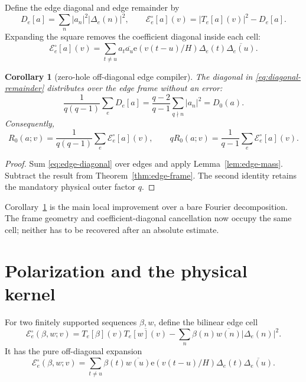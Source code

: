 \documentclass[11pt]{article}
\newtheorem{corollary}[theorem]{Corollary}
\newcommand{\e}{\mathrm e}
\newcommand{\cE}{\mathcal E}
\begin{document}
Define the edge diagonal and edge remainder by
\begin{equation}\label{eq:edge-diagonal}
 D_e[a]=\sum_n|a_n|^2|\Delta_e(n)|^2,
 \qquad
 \cE_e^\circ[a](v)=|T_e[a](v)|^2-D_e[a].
\end{equation}
Expanding the square removes the coefficient diagonal inside each cell:
\begin{equation}\label{eq:pure-off-diagonal}
 \boxed{
 \cE_e^\circ[a](v)=
 \sum_{t\ne u}a_t\overline{a_u}\e(v(t-u)/H)
 \Delta_e(t)\overline{\Delta_e(u)}.}
\end{equation}

\begin{corollary}[zero-hole off-diagonal edge compiler]
\label{cor:edge-compiler}
The diagonal in \eqref{eq:diagonal-remainder} distributes over the edge frame
without an error:
\begin{equation}\label{eq:diagonal-distribution}
 \frac1{q(q-1)}\sum_eD_e[a]
 =\frac{q-2}{q-1}\sum_{q\nmid n}|a_n|^2=D_0(a).
\end{equation}
Consequently,
\begin{equation}\label{eq:edge-remainder}
 \boxed{
 R_0(a;v)=\frac1{q(q-1)}\sum_e\cE_e^\circ[a](v),
 \qquad
 qR_0(a;v)=\frac1{q-1}\sum_e\cE_e^\circ[a](v).}
\end{equation}
\end{corollary}

\begin{proof}
Sum \eqref{eq:edge-diagonal} over edges and apply
Lemma~\ref{lem:edge-mass}.  Subtract the result from
Theorem~\ref{thm:edge-frame}.  The second identity retains the mandatory
physical outer factor $q$.
\end{proof}

Corollary~\ref{cor:edge-compiler} is the main local improvement over a bare
Fourier decomposition.  The frame geometry and coefficient-diagonal
cancellation now occupy the same cell; neither has to be recovered after an
absolute estimate.

\section{Polarization and the physical kernel}

For two finitely supported sequences $\beta,w$, define the bilinear edge cell
\begin{equation}\label{eq:bilinear-edge-cell}
 \cE_e^\circ(\beta,w;v)
 =T_e[\beta](v)\overline{T_e[w](v)}
 -\sum_n\beta(n)\overline{w(n)}|\Delta_e(n)|^2.
\end{equation}
It has the pure off-diagonal expansion
\begin{equation}\label{eq:bilinear-off-diagonal}
 \cE_e^\circ(\beta,w;v)
 =\sum_{t\ne u}\beta(t)\overline{w(u)}\e(v(t-u)/H)
 \Delta_e(t)\overline{\Delta_e(u)}.
\end{equation}
\end{document}
